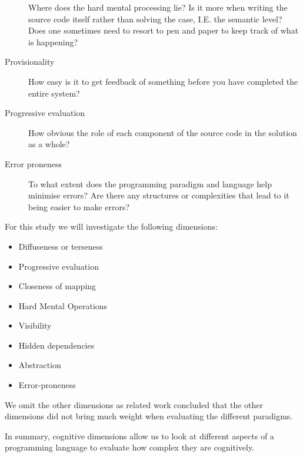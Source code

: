 \begin{description}
Where does the hard mental processing lie? Is it more when writing the source
code itself rather than solving the case, I.E. the semantic level? Does one
sometimes need to resort to pen and paper to keep track of what is happening?

\item[ Provisionality ]

How easy is it to get feedback of something before you have completed the entire
system?

\item[ Progressive evaluation ]

How obvious the role of each component of the source code in the solution as a
whole?

\item[ Error proneness ]

To what extent does the programming paradigm and language help minimise errors? Are
there any structures or complexities that lead to it being easier to make
errors?~\cite{GREEN1996131}\\
\end{description}

\noindent For this study we will investigate the following dimensions: 

\begin{itemize}
    \item Diffuseness or terseness
    \item Progressive evaluation
    \item Closeness of mapping
    \item Hard Mental Operations
    \item Visibility
    \item Hidden dependencies
    \item Abstraction
    \item Error-proneness 
\end{itemize}

\noindent We omit the other dimensions as related work concluded that the other
dimensions did not bring much weight when evaluating the different
paradigms.~\cite{euguenkiss}

In summary, cognitive dimensions allow us to look at different aspects of a
programming language to evaluate how complex they are cognitively. 

